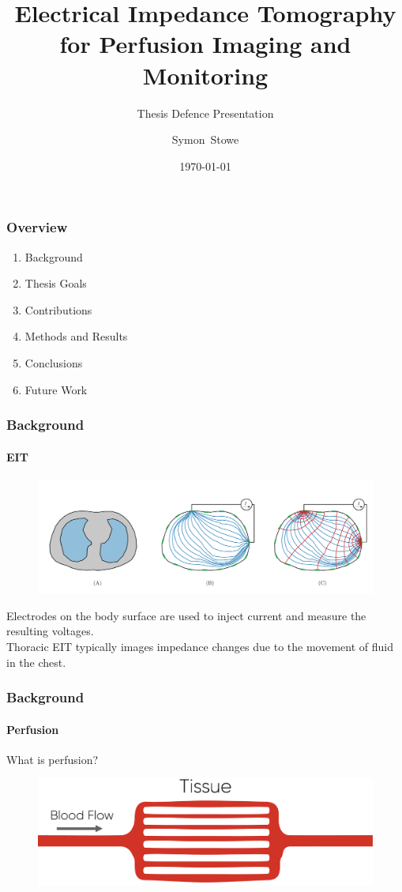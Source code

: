 \documentclass[10pt,    %
    english,            %
    xcolor=table,       %
    envcountsect,        %
    aspectratio=1610
]{beamer}
\title[] %
{Electrical Impedance Tomography for Perfusion Imaging and Monitoring}
\subtitle{Thesis Defence Presentation}
\date[] %
    {\today}
\author[] %
{Symon~Stowe} %
\institute[] %
{\texttt{symonstowe@sce.carleton.ca}
}
\begin{document}
	
\begin{frame}
  \titlepage
\end{frame}

\begin{frame}
	\frametitle{Overview}
	\begin{enumerate}
		\item Background
		\item Thesis Goals
		\item Contributions
		\item Methods and Results
		\item Conclusions
		\item Future Work 
	\end{enumerate}
\end{frame}


\begin{frame}
	\frametitle{Background}
	\framesubtitle{EIT}
	\begin{figure}
		\centering
	\includegraphics[width=\textwidth,trim={0 2cm 0 0},clip]{imgs/current_and_equipotential_lines.pdf}
	\end{figure}
	\vspace{2mm}
	Electrodes on the body surface are used to inject current and measure the resulting voltages. \\
	\vspace{0.5cm}
	Thoracic EIT typically images impedance changes due to the movement of fluid in the chest. \\
\end{frame}

\begin{frame}
	\frametitle{Background}
	\framesubtitle{Perfusion}
	{\Large What is \alert{perfusion}?} \\ \vspace{2mm}
	\begin{figure}[H]
		\centering
		\includegraphics[width=\textwidth]{perfusion_sketch.pdf}
	\end{figure}

\end{frame}
\end{document}
